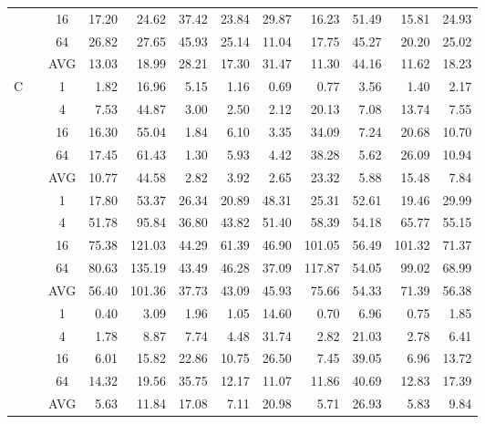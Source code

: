 \begin{table*}[]
\begin{center}
{\begin{tabular}{|c|c|c|n{3}{1}n{3}{1}n{3}{1}n{3}{1}n{3}{1}n{3}{1}n{3}{1}n{3}{1}|n{3}{1}|}
 & & 16                             & 17.20 &  24.62 & 37.42 & 23.84 & 29.87 &  16.23 & 51.49 &  15.81 & 24.93  \\
 & & 64                             & 26.82 &  27.65 & 45.93 & 25.14 & 11.04 &  17.75 & 45.27 &  20.20 & 25.02  \\  
 & & AVG                            & 13.03 &  18.99 & 28.21 & 17.30 & 31.47 &  11.30 & 44.16 &  11.62 & {\boldmath}18.23  \\ \hline
  &  & 1  &  1.82 &  16.96 &  5.15 &  1.16 &  0.69 &   0.77 &  3.56 &   1.40 &  2.17  \\
 & & 4                                                 &  7.53 &  44.87 &  3.00 &  2.50 &  2.12 &  20.13 &  7.08 &  13.74 &  7.55  \\
 & & 16                                                & 16.30 &  55.04 &  1.84 &  6.10 &  3.35 &  34.09 &  7.24 &  20.68 & 10.70  \\
 & & 64                                                & 17.45 &  61.43 &  1.30 &  5.93 &  4.42 &  38.28 &  5.62 &  26.09 & 10.94  \\  
 & & AVG                                               & 10.77 &  44.58 &  2.82 &  3.92 &  2.65 &  23.32 &  5.88 &  15.48 &  {\boldmath}7.84  \\  
 &  & 1 & 17.80 &  53.37 & 26.34 & 20.89 & 48.31 &  25.31 & 52.61 &  19.46 & 29.99 \\
 & & 4                            & 51.78 &  95.84 & 36.80 & 43.82 & 51.40 &  58.39 & 54.18 &  65.77 & 55.15 \\
 & & 16                           & 75.38 & 121.03 & 44.29 & 61.39 & 46.90 & 101.05 & 56.49 & 101.32 & 71.37 \\
 & & 64                           & 80.63 & 135.19 & 43.49 & 46.28 & 37.09 & 117.87 & 54.05 &  99.02 & 68.99 \\ 
 & & AVG                          & 56.40 & 101.36 & 37.73 & 43.09 & 45.93 &  75.66 & 54.33 &  71.39 & {\boldmath}56.38  \\  
 &  & 1 &  0.40 &   3.09 &  1.96 &  1.05 & 14.60 &   0.70 &  6.96 &   0.75 &  1.85  \\
 & & 4                            &  1.78 &   8.87 &  7.74 &  4.48 & 31.74 &   2.82 & 21.03 &   2.78 &  6.41  \\
 & & 16                           &  6.01 &  15.82 & 22.86 & 10.75 & 26.50 &   7.45 & 39.05 &   6.96 & 13.72  \\
 & & 64                           & 14.32 &  19.56 & 35.75 & 12.17 & 11.07 &  11.86 & 40.69 &  12.83 & 17.39  \\ 
 & & AVG                          &  5.63 &  11.84 & 17.08 &  7.11 & 20.98 &   5.71 & 26.93 &   5.83 &  {\boldmath}9.84  \\ \hline
\end{tabular}}
\end{center}
\end{table*}

\fi
